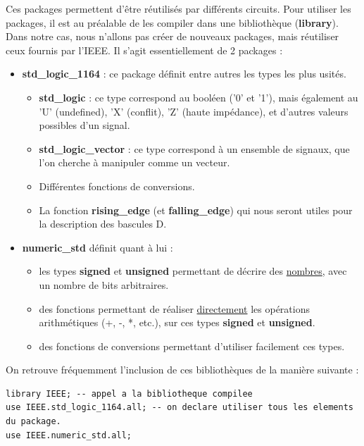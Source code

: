 \documentclass[a4paper,11pt]{article}
\begin{document}
Ces packages permettent d'être réutilisés par différents circuits. Pour utiliser les packages, il est au préalable de les compiler dans une bibliothèque (\textbf{library}). Dans notre cas, nous n'allons pas créer de nouveaux packages, mais réutiliser ceux fournis par l'IEEE. Il s'agit essentiellement de 2 packages :

\begin{itemize}
    \item \textbf{std\_logic\_1164} : ce package définit entre autres les types les plus usités.
    \begin{itemize}
        \item \textbf{std\_logic} : ce type correspond au booléen ('0' et '1'), mais également au 'U' (undefined), 'X' (conflit), 'Z' (haute impédance), et d'autres valeurs possibles d'un signal.
        \item \textbf{std\_logic\_vector} : ce type correspond à un ensemble de signaux, que l'on cherche à manipuler comme un vecteur.
        \item Différentes fonctions de conversions.
        \item La fonction \textbf{rising\_edge} (et \textbf{falling\_edge}) qui nous seront utiles pour la description des bascules D.
    \end{itemize}
    \item \textbf{numeric\_std} définit quant à lui :
    \begin{itemize}
        \item les types \textbf{signed} et \textbf{unsigned} permettant de décrire des \underline{nombres}, avec un nombre de bits arbitraires.
        \item des fonctions permettant de réaliser \underline{directement} les opérations arithmétiques (+, -, *, etc.), sur ces types \textbf{signed} et \textbf{unsigned}.
        \item des fonctions de conversions permettant d'utiliser facilement ces types.
    \end{itemize}
\end{itemize}

On retrouve fréquemment l'inclusion de ces bibliothèques de la manière suivante :

\begin{lstlisting}[style=vhdlstyle]
library IEEE; -- appel a la bibliotheque compilee
use IEEE.std_logic_1164.all; -- on declare utiliser tous les elements du package.
use IEEE.numeric_std.all;
\end{lstlisting}
\end{document}
